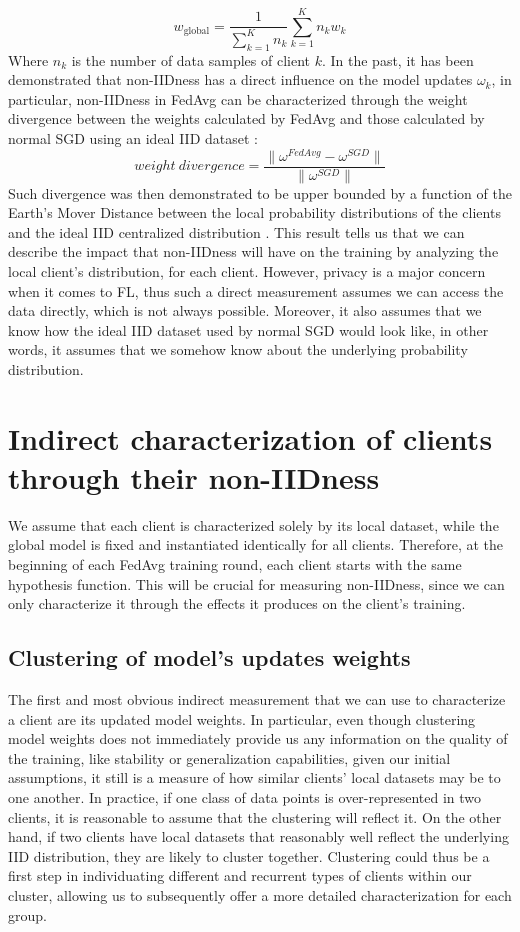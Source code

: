 \documentclass{article}
\begin{document}
\begin{equation*}
w_{\text{global}} = \frac{1}{\sum_{k=1}^K n_k} \sum_{k=1}^K n_k w_k
\end{equation*}
Where $n_k$ is the number of data samples of client $k$. In the past, it has been demonstrated that non-IIDness has a direct influence on the model updates $\omega_k$, in particular, non-IIDness in FedAvg can be characterized through the weight divergence between the weights calculated by FedAvg and those calculated by normal SGD using an ideal IID dataset \cite{FL-DataSharing}:
\begin{equation*}
    weight\ divergence = \frac{\lVert \omega^{FedAvg}-\omega^{SGD} \rVert}{\lVert \omega^{SGD} \rVert} 
\end{equation*}
Such divergence was then demonstrated to be upper bounded by a function of the Earth's Mover Distance between the local probability distributions of the clients and the ideal IID centralized distribution \cite{FL-DataSharing}.
This result tells us that we can describe the impact that non-IIDness will have on the training by analyzing the local client's distribution, for each client. However, privacy is a major concern when it comes to FL, thus such a direct measurement assumes we can access the data directly, which is not always possible. Moreover, it also assumes that we know how the ideal IID dataset used by normal SGD would look like, in other words, it assumes that we somehow know about the underlying probability distribution.

\section{Indirect characterization of clients through their non-IIDness}
We assume that each client is characterized solely by its local dataset, while the global model is fixed and instantiated identically for all clients. Therefore, at the beginning of each FedAvg training round, each client starts with the same hypothesis function. This will be crucial for measuring non-IIDness, since we can only characterize it through the effects it produces on the client's training.
\subsection{Clustering of model's updates weights}
The first and most obvious indirect measurement that we can use to characterize a client are its updated model weights. In particular, even though clustering model weights does not immediately provide us any information on the quality of the training, like stability or generalization capabilities, given our initial assumptions, it still is a measure of how similar clients' local datasets may be to one another.
In practice, if one class of data points is over-represented in two clients, it is reasonable to assume that the clustering will reflect it. On the other hand, if two clients have local datasets that reasonably well reflect the underlying IID distribution, they are likely to cluster together. Clustering could thus be a first step in individuating different and recurrent types of clients within our cluster, allowing us to subsequently offer a more detailed characterization for each group.
\end{document}
